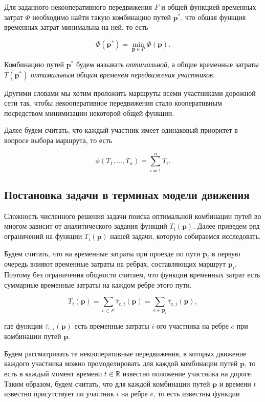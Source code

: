 \documentclass[12pt, a4paper]{article}
\DeclareMathOperator*{\minn}{min}
\begin{document}
Для заданного некооперативного передвижения $F$ и общей функцией временных затрат $\Phi$ необходимо найти такую комбинацию путей $\textbf{p}^*$, что общая функция временных затрат минимальна на ней, то есть

\begin{equation}
	\label{eq:target_global_task_T} 
	\Phi (\textbf{p}^*) = \minn\limits_{ \textbf{p} \in P} \Phi (\textbf{p}).
\end{equation}

Комбинацию путей $\textbf{p}^*$ будем называть \textit {оптимальной}, а общие временные затраты  $ T (\textbf{p}^*)$ \textit {оптимальным общим временем передвижения участников}.

Другими словами мы хотим проложить маршруты всеми участниками дорожной сети так, чтобы некооперативное передвижения стало кооперативным посредством минимизации некоторой общей функции. 

Далее будем считать, что каждый участник имеет одинаковый приоритет в вопросе выбора маршрута, то есть 

\begin{equation}
\label{eq:concrete_phi} 
\phi(T_1, \ldots, T_n) = \sum\limits_{i = 1}^nT_i.
\end{equation}

\subsection{Постановка задачи в терминах модели движения}

Сложность численного решения задачи поиска оптимальной комбинации путей во многом зависит от аналитического задания функций $T_i (\textbf{p})$. Далее приведем ряд ограничений на функции $T_i (\textbf{p})$ нашей задачи, которую собираемся исследовать.

Будем считать, что на временные затраты при проезде по пути $\textbf{p}_i$ в первую очередь влияют временные затраты на ребрах, составляющих маршрут $\textbf{p}_i$. Поэтому без ограничения общности считаем, что функции временных затрат есть суммарные временные затраты на каждом ребре этого пути.

$$T_i (\textbf{p}) = \sum \limits_{e \in E} \overline{\tau}_{e, i} (\textbf{p}) = \sum \limits_{e \in \textbf{p}_i} \overline{\tau}_{e, i} (\textbf{p}), $$

где функции $\overline{\tau}_{e, i} (\textbf{p})$ есть временные затраты $i$-ого участника на ребре $e$ при комбинации путей $\textbf{p}$. 

Будем рассматривать те некооперативные передвижения, в которых движение каждого участника можно промоделировать для каждой комбинации путей $\textbf{p}$, то есть в каждый момент времени $t \in \mathbb{R}$ известно положение участника на дороге. Таким образом, будем считать, что для каждой комбинации путей $\textbf{p}$ и времени $t$ известно присутствует ли участник $i$ на ребре $e$, то есть известны функции
\end{document}
